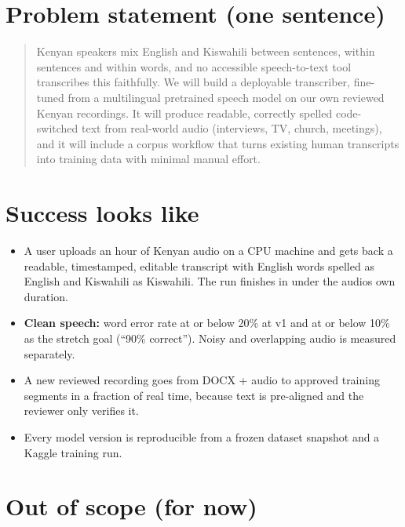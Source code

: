 \documentclass[11pt]{article}
\begin{document}
\hypertarget{problem-statement-one-sentence}{%
\section{Problem statement (one sentence)}\label{problem-statement-one-sentence}}

\begin{quote}
Kenyan speakers mix English and Kiswahili between sentences, within sentences and within words, and no accessible speech-to-text tool transcribes this faithfully. We will build a deployable transcriber, fine-tuned from a multilingual pretrained speech model on our own reviewed Kenyan recordings. It will produce readable, correctly spelled code-switched text from real-world audio (interviews, TV, church, meetings), and it will include a corpus workflow that turns existing human transcripts into training data with minimal manual effort.
\end{quote}

\hypertarget{success-looks-like}{%
\section{Success looks like}\label{success-looks-like}}

\begin{itemize}
\tightlist
\item
  A user uploads an hour of Kenyan audio on a CPU machine and gets back a readable, timestamped, editable transcript with English words spelled as English and Kiswahili as Kiswahili. The run finishes in under the audio\textquotesingle s own duration.
\item
  \textbf{Clean speech:} word error rate at or below 20\% at v1 and at or below 10\% as the stretch goal (``90\% correct''). Noisy and overlapping audio is measured separately.
\item
  A new reviewed recording goes from DOCX + audio to approved training segments in a fraction of real time, because text is pre-aligned and the reviewer only verifies it.
\item
  Every model version is reproducible from a frozen dataset snapshot and a Kaggle training run.
\end{itemize}

\hypertarget{out-of-scope-for-now}{%
\section{Out of scope (for now)}\label{out-of-scope-for-now}}
\end{document}
